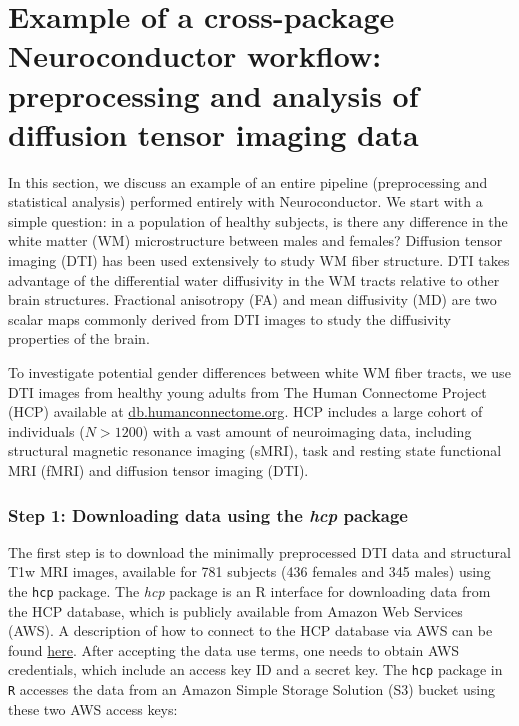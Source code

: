 \documentclass[]{elsarticle} %
\newcommand{\pkg}[1]{\emph{#1}}
\begin{document}
\section{Example of a cross-package Neuroconductor workflow: preprocessing and analysis of diffusion tensor imaging data}

In this section, we discuss an example of an entire pipeline (preprocessing and statistical analysis) performed entirely with Neuroconductor.  We start with a simple question: in a population of healthy subjects, is there any difference in the white matter (WM) microstructure between males and females? Diffusion tensor imaging (DTI) has been  used extensively to study WM fiber structure. DTI  takes advantage of the differential water diffusivity in the WM tracts relative to other brain structures. Fractional anisotropy (FA) and mean diffusivity (MD) are two scalar maps commonly derived from DTI images to study the diffusivity properties of the brain. 

To investigate potential gender differences between white WM fiber tracts, we use DTI images from healthy young adults from The Human Connectome Project (HCP) available at \url{db.humanconnectome.org}.  HCP includes a large cohort of individuals ($N > 1200$) with a vast amount of neuroimaging data, including structural magnetic resonance imaging (sMRI), task and resting state functional MRI (fMRI) and diffusion tensor imaging (DTI).

\subsubsection{Step 1: Downloading data using the \pkg{hcp} package}
The first step is to download the minimally preprocessed DTI data \citep{hcpminimal} and structural T1w MRI images, available  for 781 subjects (436 females and 345 males) using the \texttt{hcp} \citep{hcp} package.  The \pkg{hcp} package is an R interface for downloading data from the HCP database, which is publicly available from Amazon Web Services (AWS). A description of how to connect to the HCP database via AWS can be found \href{https://wiki.humanconnectome.org/display/PublicData/How+To+Connect+to+Connectome+Data+via+AWS}{here}.  After accepting the data use terms, one needs to obtain AWS credentials, which include an access key ID and a secret  key. The \texttt{hcp} package in \texttt{R} accesses the data from an Amazon Simple Storage Solution (S3) bucket using these two AWS access keys:
\end{document}
